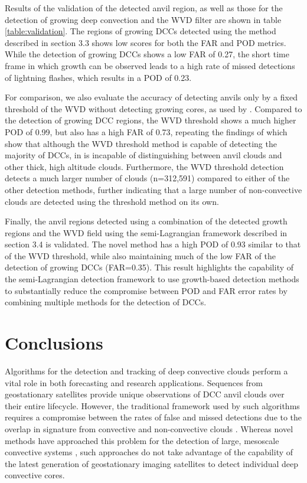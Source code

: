 Results of the validation of the detected anvil region, as well as those for the detection of growing deep convection and the WVD filter are shown in table \ref{table:validation}.
The regions of growing DCCs detected using the method described in section 3.3 shows low scores for both the FAR and POD metrics.
While the detection of growing DCCs shows a low FAR of 0.27, the short time frame in which growth can be observed leads to a high rate of missed detections of lightning flashes, which results in a POD of 0.23.

For comparison, we also evaluate the accuracy of detecting anvils only by a fixed threshold of the WVD without detecting growing cores, as used by \citet{muller_role_2018}.
Compared to the detection of growing DCC regions, the WVD threshold shows a much higher POD of 0.99, but also has a high FAR of 0.73, repeating the findings of \citet{muller_novel_2019} which show that although the WVD threshold method is capable of detecting the majority of DCCs, in is incapable of distinguishing between anvil clouds and other thick, high altitude clouds.
Furthermore, the WVD threshold detection detects a much larger number of clouds (n=312,591) compared to either of the other detection methods, further indicating that a large number of non-convective clouds are detected using the threshold method on its own.

Finally, the anvil regions detected using a combination of the detected growth regions and the WVD field using the semi-Lagrangian framework described in section 3.4 is validated.
The novel method has a high POD of 0.93 similar to that of the WVD threshold, while also maintaining much of the low FAR of the detection of growing DCCs (FAR=0.35).
This result highlights the capability of the semi-Lagrangian detection framework to use growth-based detection methods to substantially reduce the compromise between POD and FAR error rates by combining multiple methods for the detection of DCCs.


\section{Conclusions}  %

Algorithms for the detection and tracking of deep convective clouds perform a vital role in both forecasting and research applications.
Sequences from geostationary satellites provide unique observations of DCC anvil clouds over their entire lifecycle.
However, the traditional framework used by such algorithms requires a compromise between the rates of false and missed detections due to the overlap in signature from convective and non-convective clouds \citep{konduru_new_2013}.
Whereas novel methods have approached this problem for the detection of large, mesoscale convective systems \citep{fiolleau_algorithm_2013}, such approaches do not take advantage of the capability of the latest generation of geostationary imaging satellites to detect individual deep convective cores.


